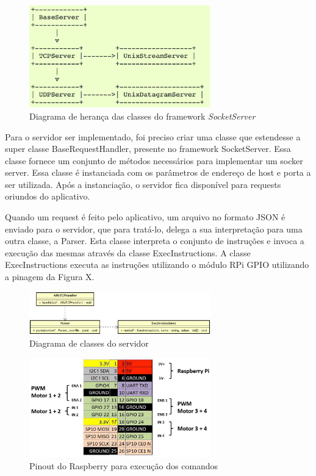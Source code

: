 \begin{figure}[H]
    \centering
    \includegraphics[width=0.7\textwidth]{figuras/socket_hierarchy.eps}
    \caption{Diagrama de herança das classes do framework \textit{SocketServer}}
    \label{fig:socket_hierarchy}
\end{figure}

Para o servidor ser implementado, foi preciso criar uma classe que estendesse a super classe BaseRequestHandler, presente no framework SocketServer. Essa classe fornece um conjunto de métodos necessários para implementar um socker server.  Essa classe é instanciada com os parâmetros de endereço de host e porta a ser utilizada. Após a instanciação, o servidor fica disponível para requests oriundos do aplicativo.

Quando um request é feito pelo aplicativo, um arquivo no formato JSON é enviado para o servidor, que para tratá-lo, delega a sua interpretação para uma outra classe, a Parser. Esta classe interpreta o conjunto de instruções e invoca a execução das mesmas através da classe ExecInstructions. A classe ExecInstructions executa as instruções utilizando o módulo RPi GPIO utilizando a pinagem da Figura X. 

\begin{figure}[H]
    \centering
    \includegraphics[width=0.7\textwidth]{figuras/server_classDiagram.eps}
    \caption{Diagrama de classes do servidor}
    \label{fig:server_classDiagram}
\end{figure}

\begin{figure}[H]
    \centering
    \includegraphics[width=0.7\textwidth]{figuras/pinagem.eps}
    \caption{Pinout do Raspberry para execução dos comandos}
    \label{fig:pinagem}
\end{figure}